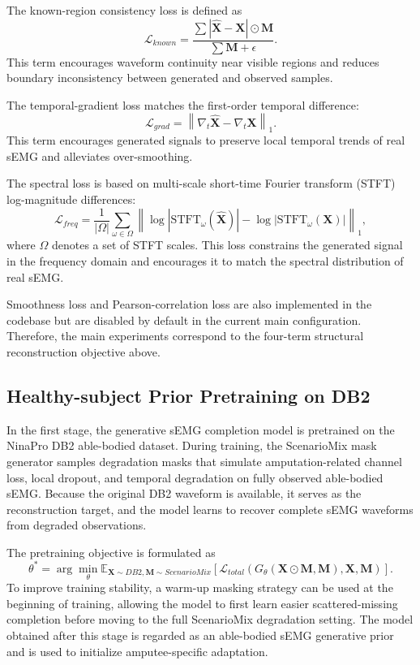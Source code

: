 \documentclass[journal]{IEEEtran}
\begin{document}
The known-region consistency loss is defined as
\begin{equation}
\mathcal{L}_{known} = \frac{\sum |\hat{\mathbf{X}}-\mathbf{X}| \odot \mathbf{M}}{\sum \mathbf{M}+\epsilon}.
\end{equation}
This term encourages waveform continuity near visible regions and reduces boundary inconsistency between generated and observed samples.

The temporal-gradient loss matches the first-order temporal difference:
\begin{equation}
\mathcal{L}_{grad} = \left\| \nabla_t \hat{\mathbf{X}} - \nabla_t \mathbf{X} \right\|_1.
\end{equation}
This term encourages generated signals to preserve local temporal trends of real sEMG and alleviates over-smoothing.

The spectral loss is based on multi-scale short-time Fourier transform (STFT) log-magnitude differences:
\begin{equation}
\mathcal{L}_{freq} = \frac{1}{|\Omega|} \sum_{\omega \in \Omega} \left\| \log |\mathrm{STFT}_{\omega}(\hat{\mathbf{X}})| - \log |\mathrm{STFT}_{\omega}(\mathbf{X})| \right\|_1,
\end{equation}
where $\Omega$ denotes a set of STFT scales. This loss constrains the generated signal in the frequency domain and encourages it to match the spectral distribution of real sEMG.

Smoothness loss and Pearson-correlation loss are also implemented in the codebase but are disabled by default in the current main configuration. Therefore, the main experiments correspond to the four-term structural reconstruction objective above.

\subsection{Healthy-subject Prior Pretraining on DB2}
In the first stage, the generative sEMG completion model is pretrained on the NinaPro DB2 able-bodied dataset. During training, the ScenarioMix mask generator samples degradation masks that simulate amputation-related channel loss, local dropout, and temporal degradation on fully observed able-bodied sEMG. Because the original DB2 waveform is available, it serves as the reconstruction target, and the model learns to recover complete sEMG waveforms from degraded observations.

The pretraining objective is formulated as
\begin{equation}
\theta^{*} = \arg\min_{\theta} \mathbb{E}_{\mathbf{X}\sim DB2,\mathbf{M}\sim ScenarioMix}\left[\mathcal{L}_{total}\left(G_{\theta}(\mathbf{X}\odot\mathbf{M},\mathbf{M}),\mathbf{X},\mathbf{M}\right)\right].
\end{equation}
To improve training stability, a warm-up masking strategy can be used at the beginning of training, allowing the model to first learn easier scattered-missing completion before moving to the full ScenarioMix degradation setting. The model obtained after this stage is regarded as an able-bodied sEMG generative prior and is used to initialize amputee-specific adaptation.
\end{document}
